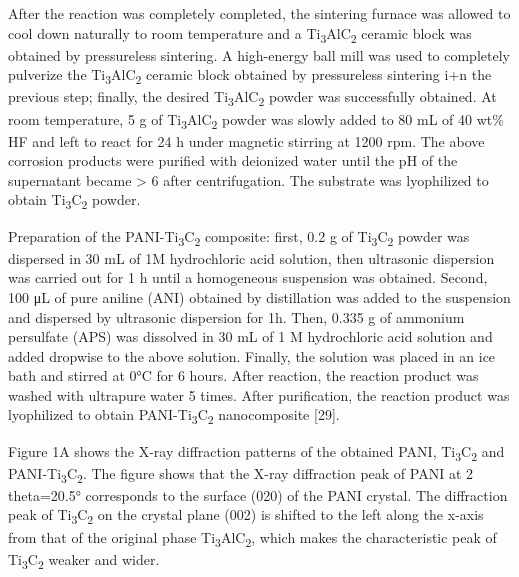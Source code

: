 \begin{multicols}{2}
After the reaction was completely completed, the sintering
furnace was allowed to cool down naturally to room temperature
and a Ti\textsubscript{3}AlC\textsubscript{2}
cer\textsubscript{}amic block was obtained by pressureless
sintering. A high-energy ball mill was used to completely
pulverize the Ti\textsubscript{3}AlC\textsubscript{2} ceramic
block obtained by pressureless sintering i+n the previous step;
finally, the desired Ti\textsubscript{3}AlC\textsubscript{2}
powder was successfully obtained. At room temperature, 5 g of
Ti\textsubscript{3}AlC\textsubscript{2} powder was slowly added to
80 mL of 40 wt\% HF and left to react for 24 h under magnetic
stirring at 1200 rpm. The above corrosion products were
purified with deionized water until the pH of the supernatant
became \textgreater{} 6 after centrifugation. The substrate was
lyophilized to obtain Ti\textsubscript{3}C\textsubscript{2} powder.

Preparation of the PANI-Ti\textsubscript{3}C\textsubscript{2}
composite: first, 0.2 g of Ti\textsubscript{3}C\textsubscript{2}
powder was dispersed in 30 mL of 1M hydrochloric acid solution,
then ultrasonic dispersion was carried out for 1 h until a
homogeneous suspension was obtained. Second, 100 μL of pure
aniline (ANI) obtained by distillation was added to the
suspension and dispersed by ultrasonic dispersion for 1h. Then,
0.335 g of ammonium persulfate (APS) was dissolved in 30 mL of 1
M hydrochloric acid solution and added dropwise to the above
solution. Finally, the solution was placed in an ice bath and
stirred at 0°C for 6 hours. After reaction, the reaction product
was washed with ultrapure water 5 times. After purification,
the reaction product was lyophilized to obtain
PANI-Ti\textsubscript{3}C\textsubscript{2} nanocomposite {[}29{]}.

Figure 1A shows the X-ray diffraction patterns of the obtained
PANI, Ti\textsubscript{3}C\textsubscript{2} and
PANI-Ti\textsubscript{3}C\textsubscript{2}. The figure shows that
the X-ray diffraction peak of PANI at 2 theta=20.5° corresponds
to the surface (020) of the PANI crystal. The diffraction peak
of Ti\textsubscript{3}C\textsubscript{2} on the crystal plane
(002) is shifted to the left along the x-axis from that of the
original phase Ti\textsubscript{3}AlC\textsubscript{2}, which
makes the characteristic peak of
Ti\textsubscript{3}C\textsubscript{2} weaker and wider.


\end{multicols}
